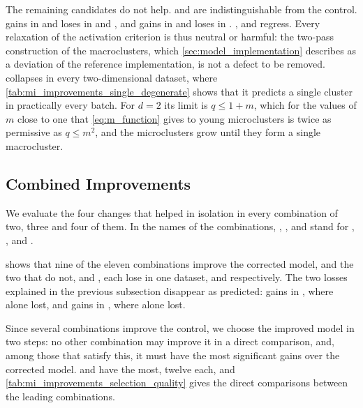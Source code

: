 The remaining candidates do not help.  and  are indistinguishable from the control.  gains in \ChameleonDSFour and loses in \BenchmarkTwo and \Cassini, and  gains in \ChameleonDSFour and loses in \Cassini. ,  and  regress. Every relaxation of the activation criterion is thus neutral or harmful: the two-pass construction of the macroclusters, which \cref{sec:model_implementation} describes as a deviation of the reference implementation, is not a defect to be removed.  collapses in every two-dimensional dataset, where \cref{tab:mi_improvements_single_degenerate} shows that it predicts a single cluster in practically every batch. For $d = 2$ its limit is $q \le 1 + m$, which for the values of $m$ close to one that \cref{eq:m_function} gives to young microclusters is twice as permissive as $q \le m^2$, and the microclusters grow until they form a single macrocluster.

\subsection{Combined Improvements}
\label{subsec:mi_improvements_combined}

We evaluate the four changes that helped in isolation in every combination of two, three and four of them. In the names of the combinations, , ,  and  stand for , ,  and .



 shows that nine of the eleven combinations improve the corrected model, and the two that do not,  and , each lose in one dataset, \Cassini and \ChameleonDSThree respectively. The two losses explained in the previous subsection disappear as predicted:  gains in \ChameleonDSThree, where  alone lost, and  gains in \ChameleonDSFour, where  alone lost.

Since several combinations improve the control, we choose the improved model in two steps: no other combination may improve it in a direct comparison, and, among those that satisfy this, it must have the most significant gains over the corrected model.  and  have the most, twelve each, and \cref{tab:mi_improvements_selection_quality} gives the direct comparisons between the leading combinations.

